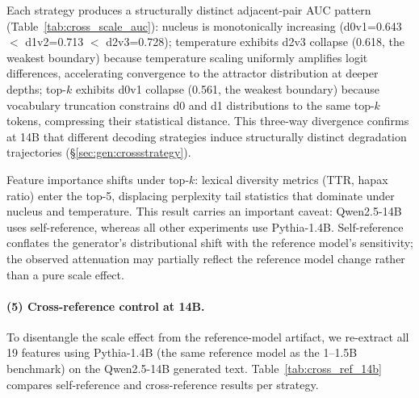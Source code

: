 Each strategy produces a structurally distinct adjacent-pair AUC pattern (Table~\ref{tab:cross_scale_auc}):
nucleus is monotonically increasing (d0v1=0.643 $<$ d1v2=0.713 $<$ d2v3=0.728);
temperature exhibits d2v3 collapse (0.618, the weakest boundary) because temperature scaling uniformly amplifies logit differences, accelerating convergence to the attractor distribution at deeper depths;
top-$k$ exhibits d0v1 collapse (0.561, the weakest boundary) because vocabulary truncation constrains d0 and d1 distributions to the same top-$k$ tokens, compressing their statistical distance.
This three-way divergence confirms at 14B that different decoding strategies induce structurally distinct degradation trajectories (\S\ref{sec:gen:crossstrategy}).

Feature importance shifts under top-$k$: lexical diversity metrics (TTR, hapax ratio) enter the top-5, displacing perplexity tail statistics that dominate under nucleus and temperature.
This result carries an important caveat: Qwen2.5-14B uses self-reference, whereas all other experiments use Pythia-1.4B.
Self-reference conflates the generator's distributional shift with the reference model's sensitivity; the observed attenuation may partially reflect the reference model change rather than a pure scale effect.

\paragraph{(5) Cross-reference control at 14B.}
To disentangle the scale effect from the reference-model artifact, we re-extract all 19 features using Pythia-1.4B (the same reference model as the 1--1.5B benchmark) on the Qwen2.5-14B generated text.
Table~\ref{tab:cross_ref_14b} compares self-reference and cross-reference results per strategy.

\begin{table}[h]
\centering
\small
\caption{14B cross-reference control: Pythia-1.4B reference vs.\ self-reference on Qwen2.5-14B text. $\Delta$: cross $-$ self. $\mathrm{EDD}_{0.70}$ computed from consecutive pairwise AUC.}
\label{tab:cross_ref_14b}
\end{table}

